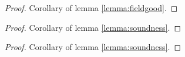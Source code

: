 \begin{theorem} \label{theorem:fieldnil}

\begin{proof}
  Corollary of lemma \ref{lemma:fieldgood}.
\end{proof}

\end{theorem}

\begin{theorem} \label{theorem:methodnil}

\begin{proof}
  Corollary of lemma \ref{lemma:soundness}.
\end{proof}

\end{theorem}

\begin{theorem} \label{theorem:nilinvoke}

\begin{proof}
  Corollary of lemma \ref{lemma:soundness}.
\end{proof}

\end{theorem}
